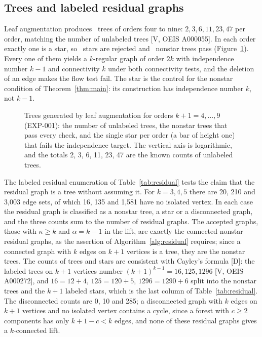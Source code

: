 \subsection{Trees and labeled residual graphs}\label{sec:res-trees}

Leaf augmentation produces \NTrees\ trees of orders four to nine: $2,3,6,11,23,47$ per order, matching the number of unlabeled trees [V, OEIS A000055].
In each order exactly one is a star, so \NStars\ stars are rejected and \NNonstar\ nonstar trees pass (Figure~\ref{fig:trees}).
Every one of them yields a $k$-regular graph of order $2k$ with independence number $k-1$ and connectivity $k$ under both connectivity tests, and the deletion of an edge makes the flow test fail.
The star is the control for the nonstar condition of Theorem~\ref{thm:main}: its construction has independence number $k$, not $k-1$.

\begin{figure}[ht]
\centering

\caption{Trees generated by leaf augmentation for orders $k+1=4,\ldots,9$ (EXP-001): the number of unlabeled trees, the nonstar trees that pass every check, and the single star per order (a bar of height one) that fails the independence target. The vertical axis is logarithmic, and the totals 2, 3, 6, 11, 23, 47 are the known counts of unlabeled trees.}
\label{fig:trees}
\end{figure}

The labeled residual enumeration of Table~\ref{tab:residual} tests the claim that the residual graph is a tree without assuming it.
For $k=3,4,5$ there are 20, 210 and 3,003 edge sets, of which 16, 135 and 1,581 have no isolated vertex.
In each case the residual graph is classified as a nonstar tree, a star or a disconnected graph, and the three counts sum to the number of residual graphs.
The accepted graphs, those with $\kappa\ge k$ and $\alpha=k-1$ in the lift, are exactly the connected nonstar residual graphs, as the assertion of Algorithm~\ref{alg:residual} requires; since a connected graph with $k$ edges on $k+1$ vertices is a tree, they are the nonstar trees.
The counts of trees and stars are consistent with Cayley's formula [D]: the labeled trees on $k+1$ vertices number $(k+1)^{k-1}=16,125,1296$ [V, OEIS A000272], and $16=12+4$, $125=120+5$, $1296=1290+6$ split into the nonstar trees and the $k+1$ labeled stars, which is the last column of Table~\ref{tab:residual}.
The disconnected counts are 0, 10 and 285; a disconnected graph with $k$ edges on $k+1$ vertices and no isolated vertex contains a cycle, since a forest with $c\ge2$ components has only $k+1-c<k$ edges, and none of these residual graphs gives a $k$-connected lift.

